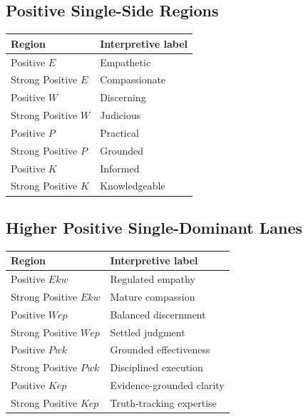 \documentclass[11pt]{article}
\begin{document}
\subsection*{Positive Single-Side Regions}
\begin{center}
\begin{tabular}{>{\raggedright\arraybackslash}p{4.3cm} >{\raggedright\arraybackslash}p{8.9cm}}
\toprule
Region & Interpretive label \\
\midrule
Positive $E$ & Empathetic \\
Strong Positive $E$ & Compassionate \\
Positive $W$ & Discerning \\
Strong Positive $W$ & Judicious \\
Positive $P$ & Practical \\
Strong Positive $P$ & Grounded \\
Positive $K$ & Informed \\
Strong Positive $K$ & Knowledgeable \\
\bottomrule
\end{tabular}
\end{center}

\subsection*{Higher Positive Single-Dominant Lanes}
\begin{center}
\begin{tabular}{>{\raggedright\arraybackslash}p{5.4cm} >{\raggedright\arraybackslash}p{7.8cm}}
\toprule
Region & Interpretive label \\
\midrule
Positive $Ekw$ & Regulated empathy \\
Strong Positive $Ekw$ & Mature compassion \\
Positive $Wep$ & Balanced discernment \\
Strong Positive $Wep$ & Settled judgment \\
Positive $Pwk$ & Grounded effectiveness \\
Strong Positive $Pwk$ & Disciplined execution \\
Positive $Kep$ & Evidence-grounded clarity \\
Strong Positive $Kep$ & Truth-tracking expertise \\
\bottomrule
\end{tabular}
\end{center}
\end{document}
